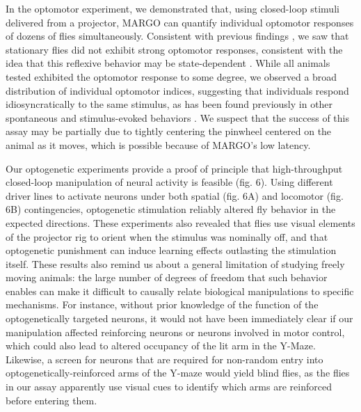 \documentclass[10pt,letterpaper]{article}
\begin{document}
In the optomotor experiment, we demonstrated that, using closed-loop stimuli delivered from a projector, MARGO can quantify individual optomotor responses of dozens of flies simultaneously. Consistent with previous findings \cite{Zhu_Peripheral_2009,Kim_Fly_2016}, we saw that stationary flies did not exhibit strong optomotor responses, consistent with the idea that this reflexive behavior may be state-dependent \cite{Rosner_Behavioural_2009, Rien_Octopaminergic_2013, Chiappe_Walking_2010, Maimon_Active_2010,gorostiza_2018}. While all animals tested exhibited the optomotor response to some degree, we observed a broad distribution of individual optomotor indices, suggesting that individuals respond idiosyncratically to the same stimulus, as has been found previously in other spontaneous and stimulus-evoked behaviors \cite{Kain_Phototactic_2012,Kain_Leg_2013,Kain_Variability_2015,Buchanan_Neuronal_2015,Todd_Systematic_2017}. We suspect that the success of this assay may be partially due to tightly centering the pinwheel centered on the animal as it moves, which is possible because of MARGO's low latency.

Our optogenetic experiments provide a proof of principle that high-throughput closed-loop manipulation of neural activity is feasible (fig. 6). Using different driver lines to activate neurons under both spatial (fig. 6A) and locomotor (fig. 6B) contingencies, optogenetic stimulation reliably altered fly behavior in the expected directions. These experiments also revealed that flies use visual elements of the projector rig to orient when the stimulus was nominally off, and that optogenetic punishment can induce learning effects outlasting the stimulation itself. These results also remind us about a general limitation of studying freely moving animals: the large number of degrees of freedom that such behavior enables can make it difficult to causally relate biological manipulations to specific mechanisms. For instance, without prior knowledge of the function of the optogenetically targeted neurons, it would not have been immediately clear if our manipulation affected reinforcing neurons or neurons involved in motor control, which could also lead to altered occupancy of the lit arm in the Y-Maze. Likewise, a screen for neurons that are required for non-random entry into optogenetically-reinforced arms of the Y-maze would yield blind flies, as the flies in our assay apparently use visual cues to identify which arms are reinforced before entering them.
\end{document}
